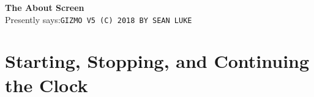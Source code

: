 \documentclass{article}
\begin{document}
\begin{description}
		
	\item{\bf The About Screen}\\
		Presently says:\quad \texttt{GIZMO V5 (C) 2018 BY SEAN LUKE}
	\end{description}

\clearpage



\section{Starting, Stopping, and Continuing the Clock }
	\label{startingclock}
\end{document}

